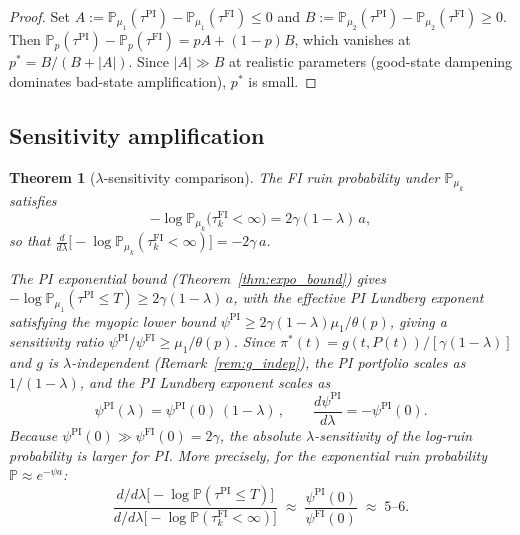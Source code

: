 \documentclass[12pt]{article}
\newtheorem{theorem}{Theorem}[section]
\theoremstyle{remark}
\theoremstyle{definition}
\newcommand{\Prob}{\mathbb{P}}
\newcommand{\FI}{\mathrm{FI}}
\newcommand{\PI}{\mathrm{PI}}
\begin{document}
\begin{proof}
Set $A := \Prob_{\mu_1}(\tau^{\PI}) - \Prob_{\mu_1}(\tau^{\FI}) \le 0$ and
$B := \Prob_{\mu_2}(\tau^{\PI}) - \Prob_{\mu_2}(\tau^{\FI}) \ge 0$.
Then $\Prob_p(\tau^{\PI}) - \Prob_p(\tau^{\FI}) = pA + (1-p)B$,
which vanishes at $p^* = B/(B+|A|)$.
Since $|A| \gg B$ at realistic parameters (good-state dampening dominates
bad-state amplification), $p^*$ is small.
\end{proof}

\subsection{Sensitivity amplification}
\label{sec:sensitivity}

\begin{theorem}[$\lambda$-sensitivity comparison]
\label{thm:sensitivity}
The FI ruin probability under $\Prob_{\mu_k}$ satisfies
\begin{equation}\label{eq:FI_logP}
  -\log \Prob_{\mu_k}\bigl(\tau_k^{\FI} < \infty\bigr)
  = 2\gamma(1-\lambda)\,a,
\end{equation}
so that
$\frac{d}{d\lambda}\bigl[-\log \Prob_{\mu_k}(\tau_k^{\FI} < \infty)\bigr]
= -2\gamma\,a$.

The PI exponential bound (Theorem~\ref{thm:expo_bound}) gives
$-\log \Prob_{\mu_1}(\tau^{\PI} \le T) \ge 2\gamma(1-\lambda)\,a$,
with the effective PI Lundberg exponent satisfying the myopic lower bound
$\psi^{\PI} \geq 2\gamma(1-\lambda)\mu_1/\theta(p)$, giving a
sensitivity ratio $\psi^{\PI}/\psi^{\FI} \geq \mu_1/\theta(p)$.
Since $\pi^*(t) = g(t,P(t))/[\gamma(1-\lambda)]$ and $g$ is
$\lambda$-independent (Remark~\ref{rem:g_indep}), the PI portfolio
scales as $1/(1-\lambda)$, and the PI Lundberg exponent scales as
\begin{equation}\label{eq:PI_psi}
  \psi^{\PI}(\lambda) = \psi^{\PI}(0)\,(1-\lambda)\,,
  \qquad
  \frac{d\psi^{\PI}}{d\lambda} = -\psi^{\PI}(0).
\end{equation}
Because $\psi^{\PI}(0) \gg \psi^{\FI}(0) = 2\gamma$, the absolute
$\lambda$-sensitivity of the log-ruin probability is larger for PI.
More precisely, for the exponential ruin probability
$\Prob \approx e^{-\psi a}$:
\begin{equation}\label{eq:sensitivity_ratio}
  \frac{d/d\lambda\bigl[-\log \Prob(\tau^{\PI} \le T)\bigr]}
       {d/d\lambda\bigl[-\log \Prob(\tau_k^{\FI} < \infty)\bigr]}
  \;\approx\;
  \frac{\psi^{\PI}(0)}{\psi^{\FI}(0)}
  \;\approx\; 5\text{--}6.
\end{equation}
\end{theorem}
\end{document}
